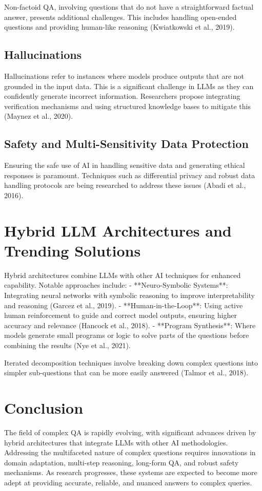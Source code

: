 \documentclass{article}
\begin{document}
Non-factoid QA, involving questions that do not have a straightforward factual answer, presents additional challenges. This includes handling open-ended questions and providing human-like reasoning (Kwiatkowski et al., 2019).

\subsection{Hallucinations}
Hallucinations refer to instances where models produce outputs that are not grounded in the input data. This is a significant challenge in LLMs as they can confidently generate incorrect information. Researchers propose integrating verification mechanisms and using structured knowledge bases to mitigate this (Maynez et al., 2020).

\subsection{Safety and Multi-Sensitivity Data Protection}
Ensuring the safe use of AI in handling sensitive data and generating ethical responses is paramount. Techniques such as differential privacy and robust data handling protocols are being researched to address these issues (Abadi et al., 2016).

\section{Hybrid LLM Architectures and Trending Solutions}
Hybrid architectures combine LLMs with other AI techniques for enhanced capability. Notable approaches include:
- **Neuro-Symbolic Systems**: Integrating neural networks with symbolic reasoning to improve interpretability and reasoning (Garcez et al., 2019).
- **Human-in-the-Loop**: Using active human reinforcement to guide and correct model outputs, ensuring higher accuracy and relevance (Hancock et al., 2018).
- **Program Synthesis**: Where models generate small programs or logic to solve parts of the questions before combining the results (Nye et al., 2021).

Iterated decomposition techniques involve breaking down complex questions into simpler sub-questions that can be more easily answered (Talmor et al., 2018).

\section{Conclusion}
The field of complex QA is rapidly evolving, with significant advances driven by hybrid architectures that integrate LLMs with other AI methodologies. Addressing the multifaceted nature of complex questions requires innovations in domain adaptation, multi-step reasoning, long-form QA, and robust safety mechanisms. As research progresses, these systems are expected to become more adept at providing accurate, reliable, and nuanced answers to complex queries.



\end{document}
